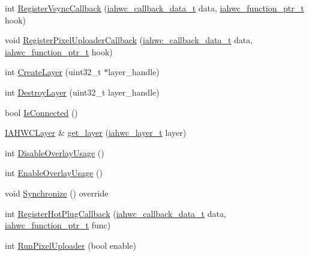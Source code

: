 \begin{DoxyCompactItemize}
\item 
int \mbox{\hyperlink{classhwcomposer_1_1IAHWC_1_1IAHWCDisplay_af1ec4019ff9078b6e3971ede75ad9393}{Register\+Vsync\+Callback}} (\mbox{\hyperlink{iahwc_8h_a07fb4f73baa8a0cfbd40f64071e56a7c}{iahwc\+\_\+callback\+\_\+data\+\_\+t}} data, \mbox{\hyperlink{iahwc_8h_a214bf51cce821fdb7b24210088c12cad}{iahwc\+\_\+function\+\_\+ptr\+\_\+t}} hook)
\item 
void \mbox{\hyperlink{classhwcomposer_1_1IAHWC_1_1IAHWCDisplay_ac7299bb8f8312073ba44cf2858642b15}{Register\+Pixel\+Uploader\+Callback}} (\mbox{\hyperlink{iahwc_8h_a07fb4f73baa8a0cfbd40f64071e56a7c}{iahwc\+\_\+callback\+\_\+data\+\_\+t}} data, \mbox{\hyperlink{iahwc_8h_a214bf51cce821fdb7b24210088c12cad}{iahwc\+\_\+function\+\_\+ptr\+\_\+t}} hook)
\item 
int \mbox{\hyperlink{classhwcomposer_1_1IAHWC_1_1IAHWCDisplay_ab8ad988a0d79affe7116a0487b8cf72b}{Create\+Layer}} (uint32\+\_\+t $\ast$layer\+\_\+handle)
\item 
int \mbox{\hyperlink{classhwcomposer_1_1IAHWC_1_1IAHWCDisplay_a36b592a04e93dba90b1f33587c3e4e11}{Destroy\+Layer}} (uint32\+\_\+t layer\+\_\+handle)
\item 
bool \mbox{\hyperlink{classhwcomposer_1_1IAHWC_1_1IAHWCDisplay_a834ade616fea8f09f45b7d1867a2e113}{Is\+Connected}} ()
\item 
\mbox{\hyperlink{classhwcomposer_1_1IAHWC_1_1IAHWCLayer}{I\+A\+H\+W\+C\+Layer}} \& \mbox{\hyperlink{classhwcomposer_1_1IAHWC_1_1IAHWCDisplay_ad83653e1509f4fd12d93cb27848bbb93}{get\+\_\+layer}} (\mbox{\hyperlink{iahwc_8h_a603c5018c43d1f6b98fbb7eeef6a43ac}{iahwc\+\_\+layer\+\_\+t}} layer)
\item 
int \mbox{\hyperlink{classhwcomposer_1_1IAHWC_1_1IAHWCDisplay_ac5d4d8c593d2aa79f1b76a19501b2c08}{Disable\+Overlay\+Usage}} ()
\item 
int \mbox{\hyperlink{classhwcomposer_1_1IAHWC_1_1IAHWCDisplay_af95bd016a960dbc57da39b41f5b05cb7}{Enable\+Overlay\+Usage}} ()
\item 
void \mbox{\hyperlink{classhwcomposer_1_1IAHWC_1_1IAHWCDisplay_a5911dd47943840836040cdeb9b3ae67b}{Synchronize}} () override
\item 
int \mbox{\hyperlink{classhwcomposer_1_1IAHWC_1_1IAHWCDisplay_ad210be9712294200396ffaf911d31457}{Register\+Hot\+Plug\+Callback}} (\mbox{\hyperlink{iahwc_8h_a07fb4f73baa8a0cfbd40f64071e56a7c}{iahwc\+\_\+callback\+\_\+data\+\_\+t}} data, \mbox{\hyperlink{iahwc_8h_a214bf51cce821fdb7b24210088c12cad}{iahwc\+\_\+function\+\_\+ptr\+\_\+t}} func)
\item 
int \mbox{\hyperlink{classhwcomposer_1_1IAHWC_1_1IAHWCDisplay_a011a99d6cc9dda103cb57a76036bdd9b}{Run\+Pixel\+Uploader}} (bool enable)
\end{DoxyCompactItemize}


